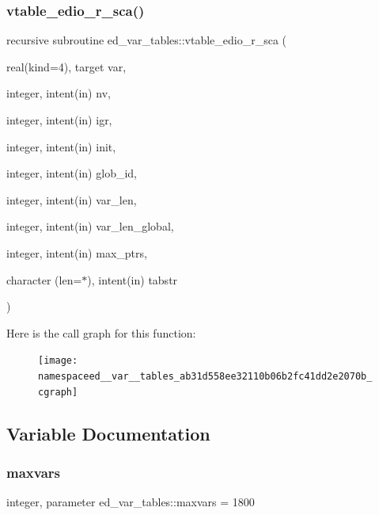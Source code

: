 \subsubsection{\texorpdfstring{vtable\+\_\+edio\+\_\+r\+\_\+sca()}{vtable\_edio\_r\_sca()}}
{\footnotesize\ttfamily recursive subroutine ed\+\_\+var\+\_\+tables\+::vtable\+\_\+edio\+\_\+r\+\_\+sca (\begin{DoxyParamCaption}\item[{real(kind=4), target}]{var,  }\item[{integer, intent(in)}]{nv,  }\item[{integer, intent(in)}]{igr,  }\item[{integer, intent(in)}]{init,  }\item[{integer, intent(in)}]{glob\+\_\+id,  }\item[{integer, intent(in)}]{var\+\_\+len,  }\item[{integer, intent(in)}]{var\+\_\+len\+\_\+global,  }\item[{integer, intent(in)}]{max\+\_\+ptrs,  }\item[{character (len=$\ast$), intent(in)}]{tabstr }\end{DoxyParamCaption})}

Here is the call graph for this function\+:
\nopagebreak
\begin{figure}[H]
\begin{center}
\leavevmode
\texttt{[image: namespaceed\_\_var\_\_tables\_ab31d558ee32110b06b2fc41dd2e2070b\_cgraph]}
\end{center}
\end{figure}


\subsection{Variable Documentation}
\mbox{\label{namespaceed__var__tables_a932cd6738531dd3348d40636bd8a20ae}} 
\subsubsection{\texorpdfstring{maxvars}{maxvars}}
{\footnotesize\ttfamily integer, parameter ed\+\_\+var\+\_\+tables\+::maxvars = 1800}

\mbox{\label{namespaceed__var__tables_ae879757190201e461d3bc09131321a64}} 
